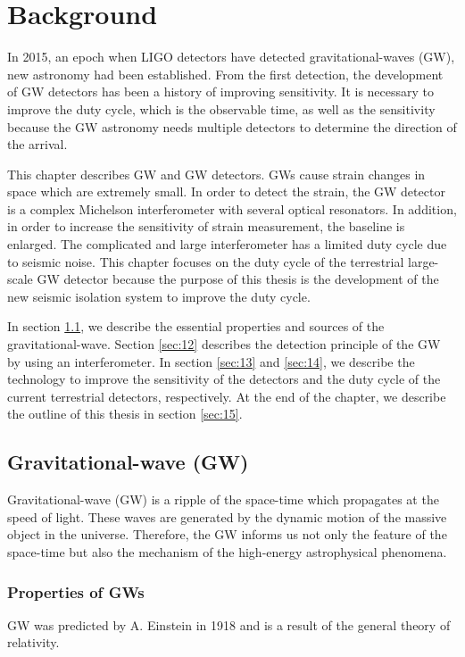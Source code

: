 \chapter{Background} \label{chap1}
In 2015, an epoch when LIGO detectors have detected gravitational-waves (GW), new astronomy had been established. From the first detection, the development of GW detectors has been a history of improving sensitivity. It is necessary to improve the duty cycle, which is the observable time, as well as the sensitivity because the GW astronomy needs multiple detectors to determine the direction of the arrival. 

This chapter describes GW and GW detectors. GWs cause strain changes in space which are extremely small. In order to detect the strain, the GW detector is a complex Michelson interferometer with several optical resonators. In addition, in order to increase the sensitivity of strain measurement, the baseline is enlarged. The complicated and large interferometer has a limited duty cycle due to seismic noise. This chapter focuses on the duty cycle of the terrestrial large-scale GW detector because the purpose of this thesis is the development of the new seismic isolation system to improve the duty cycle.

In section \cref{sec:11}, we describe the essential properties and sources of the gravitational-wave. Section \cref{sec:12} describes the detection principle of the GW by using an interferometer. In section \cref{sec:13} and \cref{sec:14}, we describe the technology to improve the sensitivity of the detectors and the duty cycle of the current terrestrial detectors, respectively. At the end of the chapter, we describe the outline of this thesis in section \cref{sec:15}.

\section{Gravitational-wave (GW)} \label{sec:11}
Gravitational-wave (GW) is a ripple of the space-time which propagates at the speed of light. These waves are generated by the dynamic motion of the massive object in the universe. Therefore, the GW informs us not only the feature of the space-time but also the mechanism of the high-energy astrophysical phenomena.

\subsection{Properties of GWs}
GW was predicted by A. Einstein in 1918 and is a result of the general theory of relativity. 

